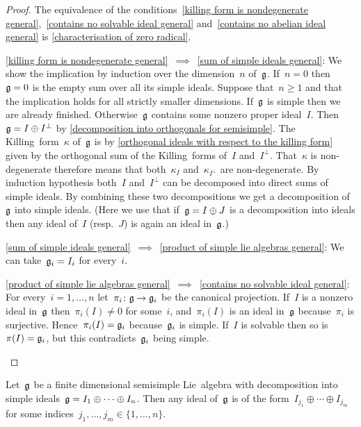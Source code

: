 \begin{proof}
  The equivalence of the conditions~\ref*{killing form is nondegenerate general},~\ref*{contains no solvable ideal general} and~\ref*{contains no abelian ideal general} is \cref{characterisation of zero radical}.
  \begin{implicationlist}
    \item[\ref*{killing form is nondegenerate general}~$\implies$~\ref*{sum of simple ideals general}:]
      We show the implication by induction over the dimension~$n$ of~$\mathfrak{g}$.
      If~$n = 0$ then~$\mathfrak{g} = 0$ is the empty sum over all its simple ideals.
      Suppose that~$n \geq 1$ and that the implication holds for all strictly smaller dimensions.
      If~$\mathfrak{g}$ is simple then we are already finished.
      Otherwise~$\mathfrak{g}$ contains some nonzero proper ideal~$I$.
      Then~$\mathfrak{g} = I \oplus I^\perp$ by \cref{decomposition into orthogonals for semisimple}.
      The Killing~form~$\kappa$ of~$\mathfrak{g}$ is by \cref{orthogonal ideals with respect to the killing form} given by the orthogonal sum of the Killing~forms of~$I$ and~$I^\perp$.
      That~$\kappa$ is non-degenerate therefore means that both~$\kappa_{I}$ and~$\kappa_{I^\perp}$ are non-degenerate. 
      By induction hypothesis both~$I$ and~$I^\perp$ can be decomposed into direct sums of simple ideals.
      By combining these two decompositions we get a decomposition of~$\mathfrak{g}$ into simple ideals.
      (Here we use that if~$\mathfrak{g} = I \oplus J$ is a decomposition into ideals then any ideal of~$I$ (resp.~$J$) is again an ideal in~$\mathfrak{g}$.)
    \item[\ref*{sum of simple ideals general}~$\implies$~\ref*{product of simple lie algebras general}:]
      We can take~$\mathfrak{g}_i = I_i$ for every~$i$.
    \item[\ref*{product of simple lie algebras general}~$\implies$~\ref*{contains no solvable ideal general}:]
      For every~$i = 1, \dotsc, n$ let~$\pi_i \colon \mathfrak{g} \to \mathfrak{g}_i$ be the canonical projection.
      If~$I$ is a nonzero ideal in~$\mathfrak{g}$ then~$\pi_i(I) \neq 0$ for some~$i$, and~$\pi_i(I)$ is an ideal in~$\mathfrak{g}$ because~$\pi_i$ is surjective.
      Hence~$\pi_i(I) = \mathfrak{g}_i$ because~$\mathfrak{g}_i$ is simple.
      If~$I$ is solvable then so is~$\pi(I) = \mathfrak{g}_i$, but this contradicts~$\mathfrak{g}_i$ being simple.
    \qedhere
  \end{implicationlist}
\end{proof}


\begin{corollary}
  \label{ideals are again sum of simples}
  Let~$\mathfrak{g}$ be a finite dimensional semisimple Lie~algebra with decomposition into simple ideals~$\mathfrak{g} = I_1 \oplus \dotsb \oplus I_n$.
  Then any ideal of~$\mathfrak{g}$ is of the form~$I_{j_1} \oplus \dotsb \oplus I_{j_m}$ for some indices~$j_1, \dotsc, j_m \in \{1, \dotsc, n\}$.
\end{corollary}


